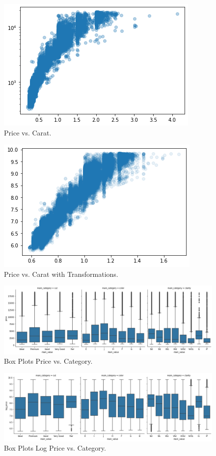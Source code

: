 \begin{figure}
	\includegraphics{images/figure51.png}
	\caption{Price vs. Carat.}\label{fig:figure51}
\end{figure}

\begin{figure}
	\includegraphics{images/figure52.png}
	\caption{Price vs. Carat with Transformations.}\label{fig:figure52}
\end{figure}

\begin{figure}
	\includegraphics[width=\textwidth,height=\textheight,keepaspectratio]{images/figure53.png}
	\caption{Box Plots Price vs. Category.}\label{fig:figure53}
\end{figure}

\begin{figure}
	\includegraphics[width=\textwidth,height=\textheight,keepaspectratio]{images/figure54.png}
	\caption{Box Plots Log Price vs. Category.}\label{fig:figure54}
\end{figure}

